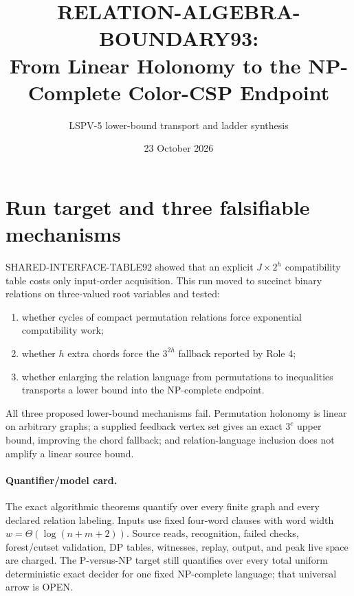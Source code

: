\documentclass[11pt]{article}
\title{RELATION-ALGEBRA-BOUNDARY93:\\From Linear Holonomy to the NP-Complete Color-CSP Endpoint}
\author{LSPV-5 lower-bound transport and ladder synthesis}
\date{23 October 2026}
\begin{document}
\maketitle

\begin{center}
\end{center}

\section{Run target and three falsifiable mechanisms}

SHARED-INTERFACE-TABLE92 showed that an explicit $J\times2^h$ compatibility
table costs only input-order acquisition.  This run moved to succinct binary
relations on three-valued root variables and tested:
\begin{enumerate}
\item whether cycles of compact permutation relations force exponential
compatibility work;
\item whether $h$ extra chords force the $3^{2h}$ fallback reported by Role 4;
\item whether enlarging the relation language from permutations to
inequalities transports a lower bound into the NP-complete endpoint.
\end{enumerate}
All three proposed lower-bound mechanisms fail.  Permutation holonomy is
linear on arbitrary graphs; a supplied feedback vertex set gives an exact
$3^c$ upper bound, improving the chord fallback; and relation-language
inclusion does not amplify a linear source bound.

\paragraph{Quantifier/model card.}
The exact algorithmic theorems quantify over every finite graph and every
declared relation labeling.  Inputs use fixed four-word clauses with word
width $w=\Theta(\log(n+m+2))$.  Source reads, recognition, failed checks,
forest/cutset validation, DP tables, witnesses, replay, output, and peak live
space are charged.  The P-versus-NP target still quantifies over every total
uniform deterministic exact decider for one fixed NP-complete language; that
universal arrow is OPEN.
\end{document}
